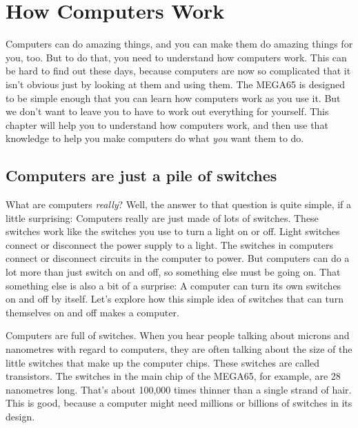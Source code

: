 \chapter{How Computers Work}

Computers can do amazing things, and you can make them do amazing things for you, too.
But to do that, you need to understand how computers work.  This can be hard to find
out these days, because computers are now so complicated that it isn't obvious just by looking at them and using them.  The MEGA65 is designed
to be simple enough that you can learn how computers work as you use it.  But we don't
want to leave you to have to work out everything for yourself.  This chapter will help you to understand how computers work, and then use that knowledge
to help you make computers do what \emph{you} want them to do.

\section{Computers are just a pile of switches}

What are computers \emph{really}? Well, the answer to that question is quite simple, if a little
surprising: Computers really are just made of lots of switches.  These switches work like the switches you use to turn a light on or off.  Light switches connect or disconnect the
power supply to a light.  The switches in computers connect or disconnect circuits in the computer
to power. But computers can do a lot more than just switch on and off, so something else must be
going on. That something else is also a bit of a surprise: A computer can turn its own switches
on and off by itself.  Let's explore how this simple idea of switches that can turn themselves on
and off makes a computer.

Computers are full of switches. When you hear people talking about microns and nanometres with regard to computers, they are often
talking about the size of the little switches that make up the computer chips.  These switches are called
transistors. The switches in the main
chip of the MEGA65, for example, are 28 nanometres long.  That's about 100,000 times thinner than a single
strand of hair.  This is good, because a computer might need millions or billions of switches in its design.
